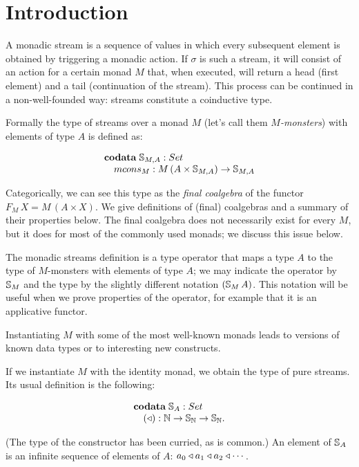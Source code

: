 \section{Introduction}

A monadic stream is a sequence of values in which every subsequent element is obtained by triggering a monadic action.
If $\sigma$ is such a stream, it will consist of an action for a certain monad $M$ that, when executed, will return a head (first element) and a tail (continuation of the stream).
This process can be continued in a non-well-founded way: streams constitute a coinductive type.

Formally the type of streams over a monad $M$ (let's call them {\em $M$-monsters}) with elements of type $A$ is defined as:

$$
\begin{array}[t]{l}
\codata\;
\stream{M,A}:\set\\
\quad \mcons_M: M\,(A\times \stream{M,A})\rightarrow\stream{M,A}
\end{array}
$$

Categorically, we can see this type as the {\em final coalgebra} of the functor $F_M\,X = M\,(A\times X)$.
We give definitions of (final) coalgebras and a summary of their properties below.
The final coalgebra does not necessarily exist for every $M$, 
but it does for most of the commonly used monads;
we discuss this issue below.

The monadic streams definition is a type operator that maps a type $A$ to the type of $M$-monsters with elements of type $A$; we may indicate the operator by $\mathbb{S}_{M}$ and the type by the slightly different notation $(\mathbb{S}_{M}\,A)$.
This notation will be useful when we prove properties of the operator, for example that it is an applicative functor.

Instantiating $M$ with some of the most well-known monads leads to versions of known data types or to interesting new constructs.

If we instantiate $M$ with the identity monad, we obtain the type of pure streams.
Its usual definition is the following:

$$
\begin{array}[t]{l}
\codata\;
\stream{A}:\set\\
\quad (\scons): \nat\rightarrow \stream{\nat} \rightarrow\stream{\nat}.
\end{array}
$$

(The type of the constructor has been curried, as is common.)
An element of $\mathbb{S}_{A}$ is an infinite sequence of elements of $A$: $a_0 \triangleleft a_1\triangleleft a_2\triangleleft \cdots$.

